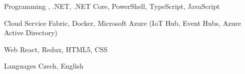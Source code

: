 

\begin{cvskills}

  \cvskill
    {Programming} %
    {\Csharp, .NET, .NET Core, PowerShell, TypeScript, JavaScript} %

  \cvskill
    {Cloud} %
    {Service Fabric, Docker, Microsoft Azure (IoT Hub, Event Hubs, Azure Active Directory)} %

  \cvskill
    {Web} %
    {React, Redux, HTML5, CSS} %

  \cvskill
    {Languages} %
    {Czech, English} %

\end{cvskills}
